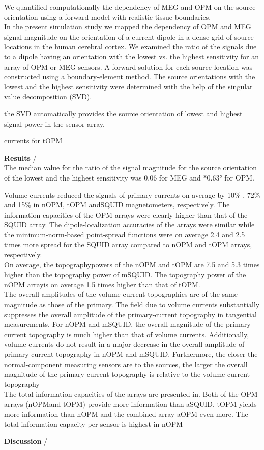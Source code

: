 \documentclass[a4paper]{article}
\begin{document}
We quantified computationally the dependency of MEG and OPM on the source orientation using a forward model with realistic tissue boundaries.\\

In the present simulation study we mapped the dependency of OPM and MEG signal magnitude on the orientation of a current dipole in a dense grid of source locations in the human cerebral cortex. We examined the ratio of the signals due to a dipole having an orientation with the lowest vs. the highest sensitivity for an array of OPM or MEG sensors. A forward solution for each source location was constructed using a boundary-element method. The source orientations with the lowest and the highest sensitivity were determined with the help of the singular value decomposition (SVD). 

the SVD automatically provides the source
orientation of lowest and highest signal power in the sensor
array.


 currents for tOPM

\textbf{Results} /  \\

The median value for the ratio of the signal magnitude for the source orientation of the lowest and the highest sensitivity was 0.06 for MEG and *0.63° for OPM. 

 Volume currents reduced the signals of primary currents on average by 10\% , 72\% and 15\% in nOPM, tOPM andSQUID magnetometers, respectively. The information capacities of the OPM arrays were clearly higher than that of the SQUID array. The dipole-localization accuracies of the arrays were similar while the minimum-norm-based point-spread functions were on average 2.4 and 2.5 times more spread for the SQUID array compared to nOPM and tOPM arrays, respectively.\\
 
 
 On average, the topographypowers of the nOPM and tOPM are 7.5 and 5.3 times higher than the topography power of mSQUID. The topography power of the nOPM arrayis on average 1.5 times higher than that of tOPM.\\

The overall amplitudes of the volume current topographies are of the same magnitude as those of the primary. The field due to volume currents substantially suppresses the overall amplitude of the primary-current topography in tangential measurements. For nOPM and mSQUID, the overall magnitude of the primary current topography is much higher than that of volume currents. Additionally, volume currents do not result in a major decrease in the overall amplitude of primary current topography in nOPM and mSQUID. Furthermore, the closer the normal-component measuring sensors are to the sources, the larger the overall magnitude of the primary-current topography is relative to the volume-current topography\\

The total information capacities of the arrays are presented in. Both of the OPM arrays (nOPMand tOPM) provide more information than aSQUID. tOPM yields more information than nOPM and the combined array aOPM even more. The total information capacity per sensor is highest in nOPM

\textbf{ Discussion} / \\
\end{document}
